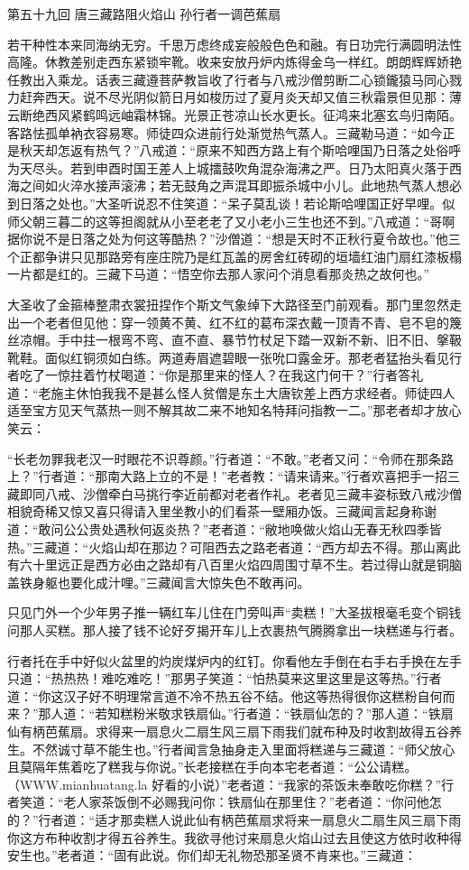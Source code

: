 \documentclass[12pt,UTF8]{ctexbook}
\begin{document}
第五十九回 唐三藏路阻火焰山 孙行者一调芭蕉扇

若干种性本来同海纳无穷。千思万虑终成妄般般色色和融。有日功完行满圆明法性高隆。休教差别走西东紧锁牢靴。收来安放丹炉内炼得金乌一样红。朗朗辉辉娇艳任教出入乘龙。话表三藏遵菩萨教旨收了行者与八戒沙僧剪断二心锁鑨猿马同心戮力赶奔西天。说不尽光阴似箭日月如梭历过了夏月炎天却又值三秋霜景但见那：薄云断绝西风紧鹤鸣远岫霜林锦。光景正苍凉山长水更长。征鸿来北塞玄鸟归南陌。客路怯孤单衲衣容易寒。师徒四众进前行处渐觉热气蒸人。三藏勒马道：“如今正是秋天却怎返有热气？”八戒道：“原来不知西方路上有个斯哈哩国乃日落之处俗呼为天尽头。若到申酉时国王差人上城擂鼓吹角混杂海沸之严。日乃太阳真火落于西海之间如火淬水接声滚沸；若无鼓角之声混耳即振杀城中小儿。此地热气蒸人想必到日落之处也。”大圣听说忍不住笑道：“呆子莫乱谈！若论斯哈哩国正好早哩。似师父朝三暮二的这等担阁就从小至老老了又小老小三生也还不到。”八戒道：“哥啊据你说不是日落之处为何这等酷热？”沙僧道：“想是天时不正秋行夏令故也。”他三个正都争讲只见那路旁有座庄院乃是红瓦盖的房舍红砖砌的垣墙红油门扇红漆板榻一片都是红的。三藏下马道：“悟空你去那人家问个消息看那炎热之故何也。”

大圣收了金箍棒整肃衣裳扭捏作个斯文气象绰下大路径至门前观看。那门里忽然走出一个老者但见他：穿一领黄不黄、红不红的葛布深衣戴一顶青不青、皂不皂的篾丝凉帽。手中拄一根弯不弯、直不直、暴节竹杖足下踏一双新不新、旧不旧、搫靸靴鞋。面似红铜须如白练。两道寿眉遮碧眼一张吮口露金牙。那老者猛抬头看见行者吃了一惊拄着竹杖喝道：“你是那里来的怪人？在我这门何干？”行者答礼道：“老施主休怕我我不是甚么怪人贫僧是东土大唐钦差上西方求经者。师徒四人适至宝方见天气蒸热一则不解其故二来不地知名特拜问指教一二。”那老者却才放心笑云：

“长老勿罪我老汉一时眼花不识尊颜。”行者道：“不敢。”老者又问：“令师在那条路上？”行者道：“那南大路上立的不是！”老者教：“请来请来。”行者欢喜把手一招三藏即同八戒、沙僧牵白马挑行李近前都对老者作礼。老者见三藏丰姿标致八戒沙僧相貌奇稀又惊又喜只得请入里坐教小的们看茶一壁厢办饭。三藏闻言起身称谢道：“敢问公公贵处遇秋何返炎热？”老者道：“敝地唤做火焰山无春无秋四季皆热。”三藏道：“火焰山却在那边？可阻西去之路老者道：“西方却去不得。那山离此有六十里远正是西方必由之路却有八百里火焰四周围寸草不生。若过得山就是铜脑盖铁身躯也要化成汁哩。”三藏闻言大惊失色不敢再问。

只见门外一个少年男子推一辆红车儿住在门旁叫声“卖糕！”大圣拔根毫毛变个铜钱问那人买糕。那人接了钱不论好歹揭开车儿上衣裹热气腾腾拿出一块糕递与行者。

行者托在手中好似火盆里的灼炭煤炉内的红钉。你看他左手倒在右手右手换在左手只道：“热热热！难吃难吃！”那男子笑道：“怕热莫来这里这里是这等热。”行者道：“你这汉子好不明理常言道不冷不热五谷不结。他这等热得很你这糕粉自何而来？”那人道：“若知糕粉米敬求铁扇仙。”行者道：“铁扇仙怎的？”那人道：“铁扇仙有柄芭蕉扇。求得来一扇息火二扇生风三扇下雨我们就布种及时收割故得五谷养生。不然诚寸草不能生也。”行者闻言急抽身走入里面将糕递与三藏道：“师父放心且莫隔年焦着吃了糕我与你说。”长老接糕在手向本宅老者道：“公公请糕。（WWW.mianhuatang.la 好看的小说）”老者道：“我家的茶饭未奉敢吃你糕？”行者笑道：“老人家茶饭倒不必赐我问你：铁扇仙在那里住？”老者道：“你问他怎的？”行者道：“适才那卖糕人说此仙有柄芭蕉扇求将来一扇息火二扇生风三扇下雨你这方布种收割才得五谷养生。我欲寻他讨来扇息火焰山过去且使这方依时收种得安生也。”老者道：“固有此说。你们却无礼物恐那圣贤不肯来也。”三藏道：
\end{document}
